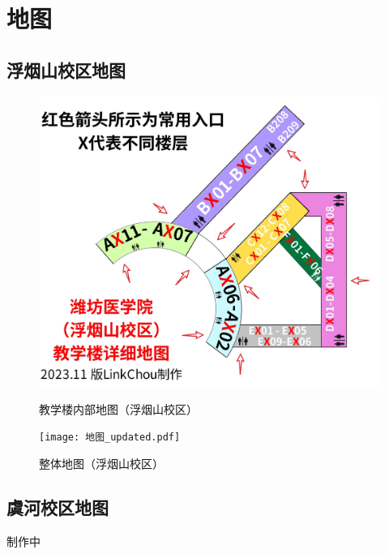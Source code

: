 \chapter[地图]{地图}

\section[浮烟山校区地图]{浮烟山校区地图\footnotemark}
\begin{figure}[H]
    \centering
    \caption[map_teach]{教学楼内部地图（浮烟山校区）}
    \vspace{1em}
    \includegraphics*[width=.9\textwidth]{教学楼_updated.jpg}
    \label{map_t}
\end{figure}

\newpage
\begin{figure}[H]
    \centering
    \caption[map_all]{整体地图（浮烟山校区）}
    \vspace{1em}
    \texttt{[image: 地图\_updated.pdf]}
    \label{map_a}
\end{figure}

\newpage
\section[虞河校区地图]{虞河校区地图}
\begin{center}
    制作中
\end{center}

